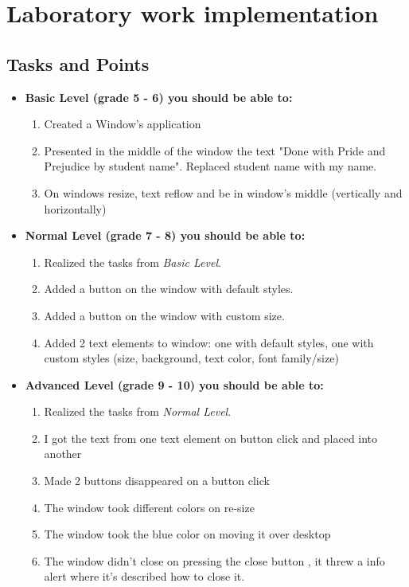 \section{Laboratory work implementation}

\subsection{Tasks and Points}
\begin{itemize}
\item \textbf{Basic Level (grade 5 - 6) you should be able to:}
	\begin{enumerate}
	\item Created a Window's application
      \item Presented in the middle of the window the text "Done with Pride and Prejudice by student name". Replaced student name with my name.
      \item On windows resize, text reflow and be in window's middle (vertically and horizontally)
      \end{enumerate}
\item \textbf{Normal Level (grade 7 - 8) you should be able to:}
      \begin{enumerate}
    \item Realized the tasks from \textit{Basic Level}.
    \item Added a button on the window with default styles.
    \item Added a button on the window with custom size.
    \item Added 2 text elements to window: one with default styles, one with custom styles (size, background, text color, font family/size)
          \end{enumerate}
\item \textbf{Advanced Level (grade 9 - 10) you should be able to:}
      \begin{enumerate}
    \item Realized the tasks from \textit{Normal Level}.
    \item I got the text from one text element on button click  and placed into another 
    \item Made 2 buttons disappeared on a button click
    
    \item The window took different colors on re-size
    \item	  The window took the blue color on moving it over desktop
    \item    The window didn't close on pressing the close button , it threw a info alert where it's described how to close it.
          \end{enumerate}
  \end{itemize}  


